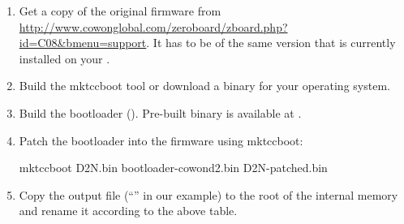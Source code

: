 \begin{enumerate}
\item Get a copy of the original \playerman{} \playertype{} firmware from
  \url{http://www.cowonglobal.com/zeroboard/zboard.php?id=C08&bmenu=support}.
  It has to be of the same version that is currently installed on your \dap{}.

\item Build the mktccboot tool or download a binary for your operating system.

\item Build the bootloader (). Pre-built binary
  is available at .

\item Patch the bootloader into the \playerman{} firmware using mktccboot:
  \begin{code}
    mktccboot D2N.bin bootloader-cowond2.bin D2N-patched.bin
  \end{code}

\item Copy the output file (``'' in our example) to the
  root of the \daps{} internal memory and rename it according to the above table.
\end{enumerate}
